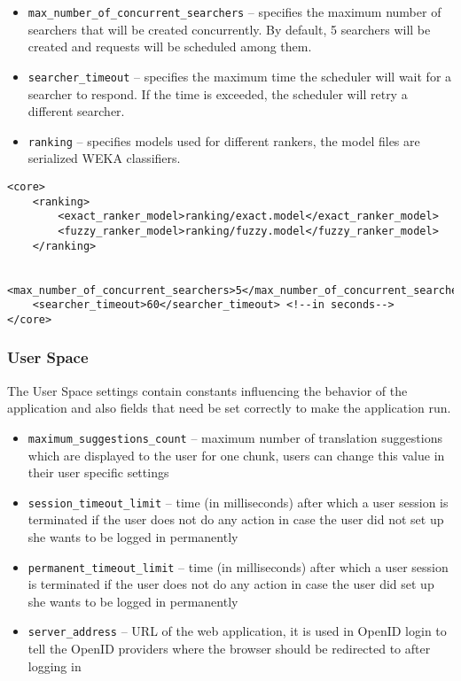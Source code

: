 \begin{itemize}
        \item \verb#max_number_of_concurrent_searchers# -- specifies the maximum number of searchers that will be created concurrently. By default, 5 searchers will be created and requests will be scheduled among them.
        \item \verb#searcher_timeout# -- specifies the maximum time the scheduler will wait for a searcher to respond. If the time is exceeded, the scheduler will retry a different searcher.
        \item \verb#ranking# -- specifies models used for different rankers, the model files are serialized WEKA classifiers.

\end{itemize}

\begin{lstlisting}
<core>
    <ranking>
        <exact_ranker_model>ranking/exact.model</exact_ranker_model>
        <fuzzy_ranker_model>ranking/fuzzy.model</fuzzy_ranker_model>
    </ranking>

    <max_number_of_concurrent_searchers>5</max_number_of_concurrent_searchers>
    <searcher_timeout>60</searcher_timeout> <!--in seconds-->
</core>

\end{lstlisting}

\subsubsection{User Space}
\label{subsec:user_scpace_settings}

The User Space settings contain constants influencing the behavior of the application and also fields that need be set correctly to make the application run.

\begin{itemize} 
\item \verb#maximum_suggestions_count# -- maximum number of translation suggestions which are displayed to the user for one chunk, users can change this value in their user specific settings
\item \verb#session_timeout_limit# -- time (in milliseconds) after which a user session is terminated if the user does not do any action in case the user did not set up she wants to be logged in permanently
\item \verb#permanent_timeout_limit# -- time (in milliseconds) after which a user session is terminated if the user does not do any action in case the user did set up she wants to be logged in permanently
\item \verb#server_address# -- URL of the web application, it is used in OpenID login to tell the OpenID providers where the browser should be redirected to after logging in

\end{itemize}

